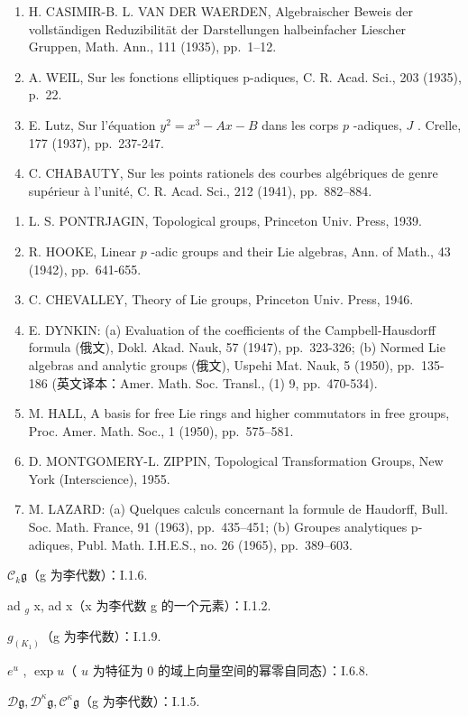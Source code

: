 \begin{enumerate}
\item
  H. CASIMIR-B. L. VAN DER WAERDEN, Algebraischer Beweis der vollständigen Reduzibilität der Darstellungen halbeinfacher Liescher Gruppen, Math. Ann., 111 (1935), pp.~1--12.
\item
  A. WEIL, Sur les fonctions elliptiques p-adiques, C. R. Acad. Sci., 203 (1935), p.~22.
\item
  E. Lutz, Sur l'équation \(y^{2} = x^{3} - Ax - B\) dans les corps \(p\) -adiques, \(J\) . Crelle, 177 (1937), pp.~237-247.
\item
  C. CHABAUTY, Sur les points rationels des courbes algébriques de genre supérieur à l'unité, C. R. Acad. Sci., 212 (1941), pp.~882--884.
\end{enumerate}

\begin{enumerate}
\def\labelenumi{\arabic{enumi}.}
\setcounter{enumi}{35}
\item
  L. S. PONTRJAGIN, Topological groups, Princeton Univ. Press, 1939.
\item
  R. HOOKE, Linear \(p\) -adic groups and their Lie algebras, Ann. of Math., 43 (1942), pp.~641-655.
\item
  C. CHEVALLEY, Theory of Lie groups, Princeton Univ. Press, 1946.
\item
  E. DYNKIN: (a) Evaluation of the coefficients of the Campbell-Hausdorff formula (俄文), Dokl. Akad. Nauk, 57 (1947), pp.~323-326; (b) Normed Lie algebras and analytic groups (俄文), Uspehi Mat. Nauk, 5 (1950), pp.~135-186 (英文译本：Amer. Math. Soc. Transl., (1) 9, pp.~470-534).
\item
  M. HALL, A basis for free Lie rings and higher commutators in free groups, Proc. Amer. Math. Soc., 1 (1950), pp.~575--581.
\item
  D. MONTGOMERY-L. ZIPPIN, Topological Transformation Groups, New York (Interscience), 1955.
\item
  M. LAZARD: (a) Quelques calculs concernant la formule de Haudorff, Bull. Soc. Math. France, 91 (1963), pp.~435--451; (b) Groupes analytiques p-adiques, Publ. Math. I.H.E.S., no. 26 (1965), pp.~389--603.
\end{enumerate}

\(\mathcal{C}_k\mathfrak{g}\)（g 为李代数）：I.1.6.

ad \(_{g}\) x, ad x（x 为李代数 g 的一个元素）：I.1.2.

\(g_{(K_{1})}\)（g 为李代数）：I.1.9.

\(e^u\) , \(\exp u\)（ \(u\) 为特征为 0 的域上向量空间的幂零自同态）：I.6.8.

\(\mathcal{D}\mathfrak{g}, \mathcal{D}^{\kappa}\mathfrak{g}, \mathcal{C}^{\kappa}\mathfrak{g}\)（g 为李代数）：I.1.5.
\relax{}
